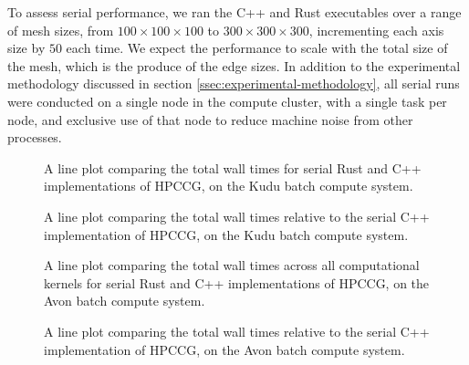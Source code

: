To assess serial performance, we ran the C++ and Rust executables over a range of mesh sizes, from $100 \times 100 \times 100$ to $300 \times 300 \times 300$, incrementing each axis size by $50$ each time. We expect the performance to scale with the total size of the mesh, which is the produce of the edge sizes. In addition to the experimental methodology discussed in section \ref{ssec:experimental-methodology}, all serial runs were conducted on a single node in the compute cluster, with a single task per node, and exclusive use of that node to reduce machine noise from other processes.

\begin{figure}[H]
    \centering
    
    \caption{A line plot comparing the total wall times for serial Rust and C++ implementations of HPCCG, on the Kudu batch compute system.}
    \label{fig:1_serial_line}
\end{figure}

\begin{figure}[H]
    \centering
    
    \caption{A line plot comparing the total wall times relative to the serial C++ implementation of HPCCG, on the Kudu batch compute system.}
    \label{fig:2_serial_line_relative}
\end{figure}

\begin{figure}[H]
    \centering
    
    \caption{A line plot comparing the total wall times across all computational kernels for serial Rust and C++ implementations of HPCCG, on the Avon batch compute system.}
    \label{fig:1_serial_line_avon}
\end{figure}

\begin{figure}[H]
    \centering
    
    \caption{A line plot comparing the total wall times relative to the serial C++ implementation of HPCCG, on the Avon batch compute system.}
    \label{fig:2_serial_line_relative_avon}
\end{figure}


